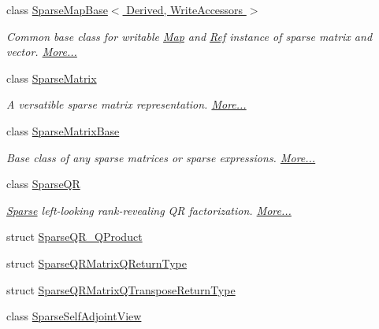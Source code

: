 \begin{DoxyCompactItemize}
class \hyperlink{group___sparse_core___module_class_eigen_1_1_sparse_map_base_3_01_derived_00_01_write_accessors_01_4}{Sparse\+Map\+Base$<$ Derived, Write\+Accessors $>$}
\begin{DoxyCompactList}\small\item\em Common base class for writable \hyperlink{group___core___module_class_eigen_1_1_map}{Map} and \hyperlink{group___core___module_class_eigen_1_1_ref}{Ref} instance of sparse matrix and vector.  \hyperlink{group___sparse_core___module_class_eigen_1_1_sparse_map_base_3_01_derived_00_01_write_accessors_01_4}{More...}\end{DoxyCompactList}\item 
class \hyperlink{group___sparse_core___module_class_eigen_1_1_sparse_matrix}{Sparse\+Matrix}
\begin{DoxyCompactList}\small\item\em A versatible sparse matrix representation.  \hyperlink{group___sparse_core___module_class_eigen_1_1_sparse_matrix}{More...}\end{DoxyCompactList}\item 
class \hyperlink{group___sparse_core___module_class_eigen_1_1_sparse_matrix_base}{Sparse\+Matrix\+Base}
\begin{DoxyCompactList}\small\item\em Base class of any sparse matrices or sparse expressions.  \hyperlink{group___sparse_core___module_class_eigen_1_1_sparse_matrix_base}{More...}\end{DoxyCompactList}\item 
class \hyperlink{group___sparse_q_r___module_class_eigen_1_1_sparse_q_r}{Sparse\+QR}
\begin{DoxyCompactList}\small\item\em \hyperlink{struct_eigen_1_1_sparse}{Sparse} left-\/looking rank-\/revealing QR factorization.  \hyperlink{group___sparse_q_r___module_class_eigen_1_1_sparse_q_r}{More...}\end{DoxyCompactList}\item 
struct \hyperlink{struct_eigen_1_1_sparse_q_r___q_product}{Sparse\+Q\+R\+\_\+\+Q\+Product}
\item 
struct \hyperlink{struct_eigen_1_1_sparse_q_r_matrix_q_return_type}{Sparse\+Q\+R\+Matrix\+Q\+Return\+Type}
\item 
struct \hyperlink{struct_eigen_1_1_sparse_q_r_matrix_q_transpose_return_type}{Sparse\+Q\+R\+Matrix\+Q\+Transpose\+Return\+Type}
\item 
class \hyperlink{group___sparse_core___module_class_eigen_1_1_sparse_self_adjoint_view}{Sparse\+Self\+Adjoint\+View}

\end{DoxyCompactItemize}
